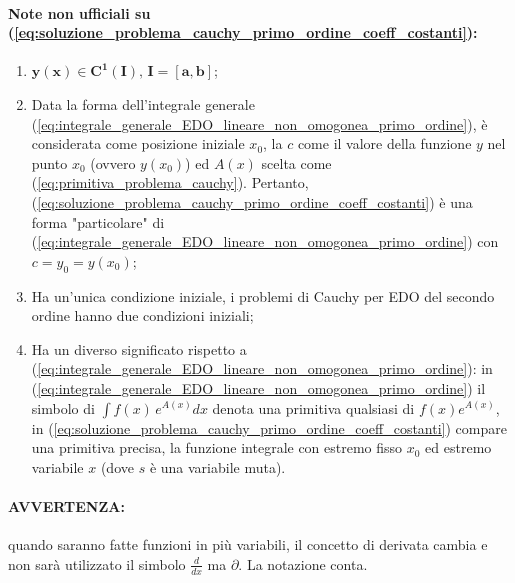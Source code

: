 \paragraph{Note non ufficiali su (\ref{eq:soluzione_problema_cauchy_primo_ordine_coeff_costanti}):}
\begin{enumerate}
    \item $\boldsymbol{y(x)\in C^1(I),\, I=[a,b]}$;
    \item Data la forma dell'integrale generale (\ref{eq:integrale_generale_EDO_lineare_non_omogonea_primo_ordine}), è considerata come posizione iniziale $x_0$, la $c$ come il valore della funzione $y$ nel punto $x_0$ (ovvero $y(x_0)$) ed $A(x)$ scelta come (\ref{eq:primitiva_problema_cauchy}). Pertanto, (\ref{eq:soluzione_problema_cauchy_primo_ordine_coeff_costanti}) è una forma "particolare" di (\ref{eq:integrale_generale_EDO_lineare_non_omogonea_primo_ordine}) con $c=y_0=y(x_0)$;
    \item Ha un'unica condizione iniziale, i problemi di Cauchy per EDO del secondo ordine hanno due condizioni iniziali;
    \item Ha un diverso significato rispetto a (\ref{eq:integrale_generale_EDO_lineare_non_omogonea_primo_ordine}): in (\ref{eq:integrale_generale_EDO_lineare_non_omogonea_primo_ordine}) il simbolo di $\int f(x)\, e^{A(x)} dx$ denota una primitiva qualsiasi di $f(x)e^{A(x)}$, in (\ref{eq:soluzione_problema_cauchy_primo_ordine_coeff_costanti}) compare una primitiva precisa, la funzione integrale con estremo fisso $x_0$ ed estremo variabile $x$ (dove $s$ è una variabile muta).
\end{enumerate}

\paragraph{AVVERTENZA:} quando saranno fatte funzioni in più variabili, il concetto di derivata cambia e non sarà utilizzato il simbolo $\frac{d}{dx}$ ma $\partial$. La notazione conta.

